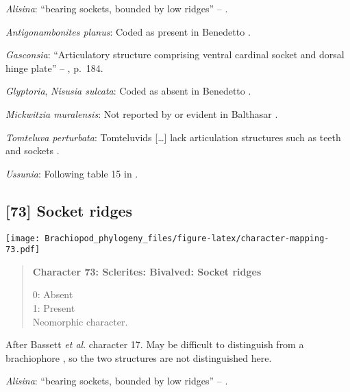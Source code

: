 \documentclass[openany]{book}
\theoremstyle{definition}
\theoremstyle{definition}
\theoremstyle{definition}
\theoremstyle{remark}
\begin{document}
\hypertarget{Alisina-coding-72}{}
\emph{Alisina}: ``bearing sockets, bounded by low ridges'' --
\citet{Williams2000LinguliformeaCraniiformea}.

\hypertarget{Antigonambonites_planus-coding-72}{}
\emph{Antigonambonites planus}: Coded as present in Benedetto
\citeyearpar{Benedetto2009iChaniella}.

\hypertarget{Gasconsia-coding-72}{}
\emph{Gasconsia}: ``Articulatory structure comprising ventral cardinal
socket and dorsal hinge plate'' --
\citet{Williams2000LinguliformeaCraniiformea}, p.~184.

\hypertarget{Glyptoria-coding-72}{}
\emph{Glyptoria}, \emph{Nisusia sulcata}: Coded as absent in Benedetto
\citeyearpar{Benedetto2009iChaniella}.

\hypertarget{Mickwitzia_muralensis-coding-72}{}
\emph{Mickwitzia muralensis}: Not reported by or evident in Balthasar
\citeyearpar{Balthasar2004Shellstructure}.

\hypertarget{Tomteluva_perturbata-coding-72}{}
\emph{Tomteluva perturbata}: Tomteluvids {[}\ldots{}{]} lack
articulation structures such as teeth and sockets
\citep{Streng2016Anew}.

\hypertarget{Ussunia-coding-72}{}
\emph{Ussunia}: Following table 15 in
\citet{Williams2000LinguliformeaCraniiformea}.

\subsection*{{[}73{]} Socket ridges}\label{socket-ridges}

\texttt{[image: Brachiopod\_phylogeny\_files/figure-latex/character-mapping-73.pdf]}

\begin{quote}
\textbf{Character 73: Sclerites: Bivalved: Socket ridges}

0: Absent\\
1: Present\\
Neomorphic character.
\end{quote}

After Bassett \emph{et al}.
\citeyearpar{Bassett2001Functionalmorphology} character 17. May be
difficult to distinguish from a brachiophore \citep[see Fig 323
in][]{Williams1997Introduction}, so the two structures are not
distinguished here.

\hypertarget{Alisina-coding-73}{}
\emph{Alisina}: ``bearing sockets, bounded by low ridges'' --
\citet{Williams2000LinguliformeaCraniiformea}.
\end{document}
